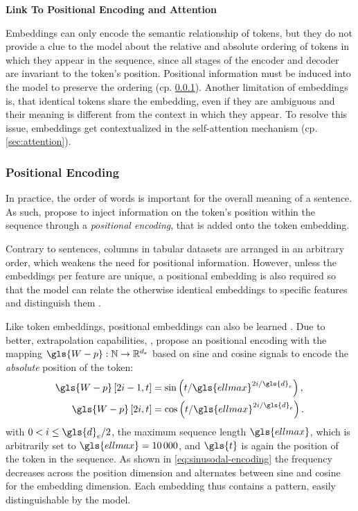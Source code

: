 \textbf{Link To Positional Encoding and Attention}

Embeddings can only encode the semantic relationship of tokens, but they do not provide a clue to the model about the relative and absolute ordering of tokens in which they appear in the sequence, since all stages of the encoder and decoder are invariant to the token's position. Positional information must be induced into the model to preserve the ordering (cp. \cref{sec:positional-encoding}). Another limitation of embeddings is, that identical tokens share the embedding, even if they are ambiguous and their meaning is different from the context in which they appear. To resolve this issue, embeddings get contextualized in the self-attention mechanism (cp. \cref{sec:attention}).

\subsubsection{Positional Encoding}\label{sec:positional-encoding}

In practice, the order of words is important for the overall meaning of a sentence. As such, \textcite[][6006]{vaswaniAttentionAllYou2017} propose to inject information on the \gls{token}'s position within the sequence through a \emph{positional encoding}, that is added onto the \gls{token} embedding.

Contrary to sentences, columns in tabular datasets are arranged in an arbitrary order, which weakens the need for positional information. However, unless the embeddings per feature are unique, a positional embedding is also required so that the model can relate the otherwise identical embeddings to specific features and distinguish them \autocites[][3]{huangTabTransformerTabularData2020}[][15]{somepalliSaintImprovedNeural2021}.

Like \gls{token} embeddings, positional embeddings can also be learned \autocite[cp.][4174]{devlinBERTPretrainingDeep2019}. Due to better, extrapolation capabilities, \textcite[][6006]{vaswaniAttentionAllYou2017}, propose an positional encoding with the mapping $\gls{W-p}: \mathbb{N} \rightarrow \mathbb{R}^{d_{e}}$ based on sine and cosine signals to encode the \emph{absolute} position of the \gls{token}:
\begin{equation}
    \begin{aligned}
        \gls{W-p}\left[2 i-1, t\right] & =\sin \left(t / \gls{ellmax}^{2 i / \gls{d}_e}\right), \\
        \gls{W-p}\left[2 i, t\right]   & =\cos \left(t / \gls{ellmax}^{2 i / \gls{d}_e}\right).
    \end{aligned}
    \label{eq:sinusodal-encoding}
\end{equation}
with $0<i \leq \gls{d}_{e} / 2$, the maximum sequence length $\gls{ellmax}$, which is arbitrarily set to $\gls{ellmax}=\num{10000}$, and $\gls{t}$ is again the position of the \gls{token} in the sequence. As shown in \cref{eq:sinusodal-encoding} the frequency decreases across the position dimension and alternates between sine and cosine for the embedding dimension. Each embedding thus contains a pattern, easily distinguishable by the model.

